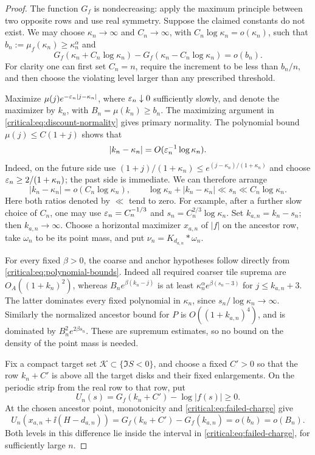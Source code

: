 \begin{proof}
The function \(G_f\) is nondecreasing: apply the maximum principle
between two opposite rows and use real symmetry. Suppose the claimed
constants do not exist. We may choose \(\kappa_n\to\infty\) and
\(C_n\to\infty\), with \(C_n\log\kappa_n=o(\kappa_n)\), such
that \(b_n:=\mu_f(\kappa_n)\ge\kappa_n^\alpha\) and
\begin{equation}\label{critical:eq:failed-charge}
 G_f(\kappa_n+C_n\log\kappa_n)
       -G_f(\kappa_n-C_n\log\kappa_n)=o(b_n).
\end{equation}
For clarity one can first set \(C_n=n\), require the increment to
be less than \(b_n/n\), and then choose the violating level larger
than any prescribed threshold.

Maximize \(\mu(j)e^{-\varepsilon_n|j-\kappa_n|}\), where
\(\varepsilon_n\downarrow0\) sufficiently slowly, and denote the
maximizer by \(k_n\), with \(B_n=\mu(k_n)\ge b_n\).
The maximizing argument in \eqref{critical:eq:discount-normality}
gives primary normality. The polynomial bound \(\mu(j)\le C(1+j)\)
shows that
\[
 |k_n-\kappa_n|=O(\varepsilon_n^{-1}\log\kappa_n).
\]
Indeed, on the future side use
\((1+j)/(1+\kappa_n)\le e^{(j-\kappa_n)/(1+\kappa_n)}\)
and choose \(\varepsilon_n\ge2/(1+\kappa_n)\); the past side is
immediate. We can therefore arrange
\[
 |k_n-\kappa_n|=o(C_n\log\kappa_n),\qquad
 \log\kappa_n+|k_n-\kappa_n|\ll s_n
       \ll C_n\log\kappa_n.
\]
Here both ratios denoted by \(\ll\) tend to zero. For example,
after a further slow choice of \(C_n\), one may use
\(\varepsilon_n=C_n^{-1/3}\) and \(s_n=C_n^{2/3}\log\kappa_n\).
Set \(k_{a,n}=k_n-s_n\); then \(k_{a,n}\to\infty\).
Choose a horizontal maximizer \(x_{a,n}\) of \(|f|\) on the
ancestor row, take \(\omega_n\) to be its point mass, and put
\(\nu_n=K_{d_{a,n}}*\omega_n\).

For every fixed \(\beta>0\), the coarse and anchor hypotheses
follow directly from \eqref{critical:eq:polynomial-bounds}.
Indeed all required coarser tile suprema are \(O_A((1+k_n)^2)\),
whereas \(B_n e^{\beta(k_n-j)}\) is at least
\(\kappa_n^\alpha e^{\beta(s_n-3)}\) for
\(j\le k_{a,n}+3\). The latter dominates every fixed polynomial
in \(\kappa_n\), since \(s_n/\log\kappa_n\to\infty\).
Similarly the normalized ancestor bound for \(P\) is
\(O((1+k_{a,n})^4)\), and is dominated by
\(B_n^2e^{2\beta s_n}\). These are supremum estimates, so no
bound on the density of the point mass is needed.

Fix a compact target set \(\mathcal K\subset\{\Im S<0\}\),
and choose a fixed \(C'>0\) so that the row \(k_n+C'\) is above
all the target disks and their fixed enlargements. On the periodic
strip from the real row to that row, put
\[
 U_n(s)=G_f(k_n+C')-\log|f(s)|\ge0.
\]
At the chosen ancestor point, monotonicity and
\eqref{critical:eq:failed-charge} give
\begin{equation}\label{critical:eq:small-ancestor-deficit}
 U_n(x_{a,n}+\ii(H-d_{a,n}))
   =G_f(k_n+C')-G_f(k_{a,n})=o(b_n)=o(B_n).
\end{equation}
Both levels in this difference lie inside the interval in
\eqref{critical:eq:failed-charge}, for sufficiently large \(n\).


\end{proof}

